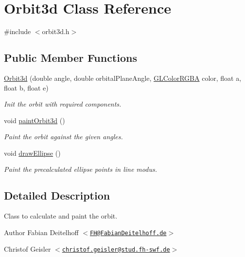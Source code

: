 \hypertarget{classOrbit3d}{
\section{\-Orbit3d \-Class \-Reference}
\label{d8/d23/classOrbit3d}
}


{\ttfamily \#include $<$orbit3d.\-h$>$}

\subsection*{\-Public \-Member \-Functions}
\begin{DoxyCompactItemize}
\item 
\hyperlink{classOrbit3d_af755e094b26297e18213c6039d370170}{\-Orbit3d} (double angle, double orbital\-Plane\-Angle, \hyperlink{classGLColorRGBA}{\-G\-L\-Color\-R\-G\-B\-A} color, float a, float b, float e)
\begin{DoxyCompactList}\small\item\em \-Init the orbit with required components. \end{DoxyCompactList}\item 
void \hyperlink{classOrbit3d_afcf596df8804d489732346c8339bbac0}{paint\-Orbit3d} ()
\begin{DoxyCompactList}\small\item\em \-Paint the orbit against the given angles. \end{DoxyCompactList}\item 
void \hyperlink{classOrbit3d_ab183f3086b45b75f594e457e0b9563f2}{draw\-Ellipse} ()
\begin{DoxyCompactList}\small\item\em \-Paint the precalculated ellipse points in line modus. \end{DoxyCompactList}\end{DoxyCompactItemize}


\subsection{\-Detailed \-Description}
\-Class to calculate and paint the orbit.

\begin{DoxyAuthor}{\-Author}
\-Fabian \-Deitelhoff $<$\href{mailto:FH@FabianDeitelhoff.de}{\tt \-F\-H@\-Fabian\-Deitelhoff.\-de}$>$ 

\-Christof \-Geisler $<$\href{mailto:christof.geisler@stud.fh-swf.de}{\tt christof.\-geisler@stud.\-fh-\/swf.\-de}$>$ 
\end{DoxyAuthor}


